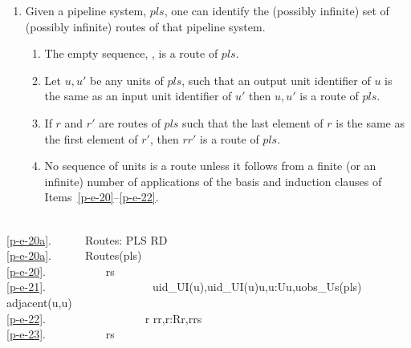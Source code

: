 \LLLL

\begin{enumerate}\setei
\item \label{p-e-20a}   Given a pipeline system, $pls$, one can identify the
                  (possibly infinite) set of (possibly infinite) routes
                  of that pipeline system.
\begin{enumerate}
\item \label{p-e-20}  The empty sequence, {\LANGLE}{\RANGLE}, is a
                      route of $pls$.  
\item \label{p-e-21}  Let $u, u'$ be any units of $pls$, such that
                      an output unit identifier of $u$ is the same as
                      an input unit identifier of $u'$ then
                      {\LANGLE}$u,u'${\RANGLE} is a route of $pls$.
\item \label{p-e-22}  If $r$ and $r'$ are routes of $pls$ such that
                      the last element of $r$ is the same as the first
                      element of $r'$, then $r${\CONCAT}$r'$ is
                      a route of $pls$.  
\item \label{p-e-23}  No sequence of units is a route unless it
                      follows from a finite (or an infinite) number of
                      applications of the basis and induction clauses
                      of Items~\ref{p-e-20}--\ref{p-e-22}.
\end{enumerate}
\savei\end{enumerate}

\mnewfoil\LLLL\HHHH

\bp
\>\ \\
\ref{p-e-20a}.\ \ \ \ \ \ Routes: PLS {\RIGHTARROW} RD\\
\ref{p-e-20a}.\ \ \ \ \ \ Routes(pls) {\IS} \\
\ref{p-e-20}.\ \ \ \ \ \ \ \ \ \  rs {\EQ} {\LANGLE}{\RANGLE} {\UNION} \\
\ref{p-e-21}.\ \ \ \ \ \ \ \ \ \ \ \ \ \ \ \ \ \ \ {\LBRACE}{\LANGLE}uid\_UI(u),uid\_UI(u{\PRIM}){\RANGLE}{\BAR}u,u{\PRIM}:U{\RDOT}{\LBRACE}u,u{\PRIM}{\RBRACE}{\SUBSETEQ}obs\_Us(pls) {\WEDGE} adjacent(u,u{\PRIM}){\RBRACE}\\
\ref{p-e-22}.\ \ \ \ \ \ \ \ \ \ \ \ \ \ \ \ \ {\UNION} {\LBRACE}r{\CONCAT} r{\PRIM}{\BAR}r,r{\PRIM}:R{\RDOT}{\LBRACE}r,r{\PRIM}{\RBRACE}{\SUBSETEQ}rs{\RBRACE}\\
\ref{p-e-23}.\ \ \ \ \ \ \ \ \ \  rs 
\ep

